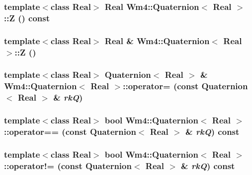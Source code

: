 \subsubsection{\setlength{\rightskip}{0pt plus 5cm}template$<$class Real$>$ Real {\bf Wm4::Quaternion}$<$ Real $>$::Z () const\hspace{0.3cm}{\tt  [inline]}}\label{classWm4_1_1Quaternion_2438c994cabdd62a83b24753f0879f76}


\subsubsection{\setlength{\rightskip}{0pt plus 5cm}template$<$class Real$>$ Real \& {\bf Wm4::Quaternion}$<$ Real $>$::Z ()\hspace{0.3cm}{\tt  [inline]}}\label{classWm4_1_1Quaternion_7e47f1d93ceddf958af894a50213ac19}


\subsubsection{\setlength{\rightskip}{0pt plus 5cm}template$<$class Real$>$ {\bf Quaternion}$<$ Real $>$ \& {\bf Wm4::Quaternion}$<$ Real $>$::operator= (const {\bf Quaternion}$<$ Real $>$ \& {\em rk\-Q})\hspace{0.3cm}{\tt  [inline]}}\label{classWm4_1_1Quaternion_9f9051f46cc3b6e7c70d9cd0cd7f12ff}


\subsubsection{\setlength{\rightskip}{0pt plus 5cm}template$<$class Real$>$ bool {\bf Wm4::Quaternion}$<$ Real $>$::operator== (const {\bf Quaternion}$<$ Real $>$ \& {\em rk\-Q}) const}\label{classWm4_1_1Quaternion_17374f4682b525fbfc77bff020c6fa1f}


\subsubsection{\setlength{\rightskip}{0pt plus 5cm}template$<$class Real$>$ bool {\bf Wm4::Quaternion}$<$ Real $>$::operator!= (const {\bf Quaternion}$<$ Real $>$ \& {\em rk\-Q}) const}\label{classWm4_1_1Quaternion_8cfb7695938a7e9bc4595d17d95aebfd}


